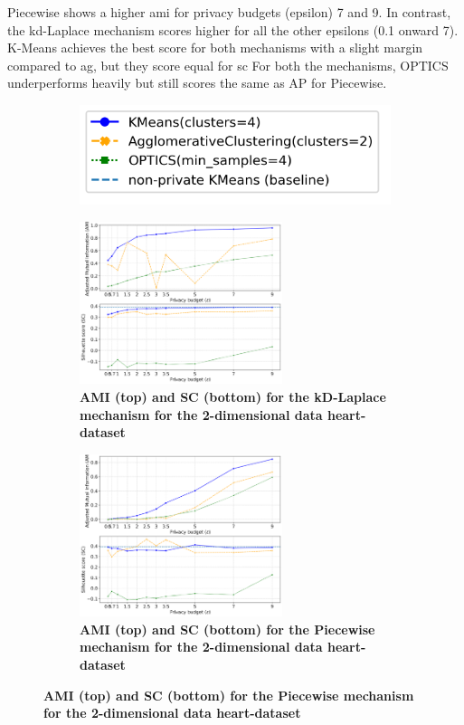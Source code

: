 Piecewise shows a higher \gls{ami} for privacy budgets (epsilon) 7 and 9. In contrast, the kd-Laplace mechanism scores higher for all the other epsilons (0.1 onward 7).
K-Means achieves the best score for both mechanisms with a slight margin compared to \gls{ag}, but they score equal for \gls{sc}
For both the mechanisms, OPTICS underperforms heavily but still scores the same as AP for Piecewise.
\newpage
\begin{figure}[H]
  \centering
  \begin{subfigure}{0.3\textwidth}
    \includegraphics[width=\textwidth]{Results/kd-laplace/kd-Laplace/heart-dataset/legend_2.png}
  \end{subfigure}
  \begin{subfigure}{1\textwidth}
    \caption{\textbf{AMI (top) and SC (bottom) for the kD-Laplace mechanism for the 2-dimensional data heart-dataset}}
    \centering
    \includegraphics[width=0.65\textwidth]{Results/kd-laplace/kd-Laplace/heart-dataset/ami-and-sc_2_dimensions.png}
    \centering
  \end{subfigure}
  \begin{subfigure}{1\textwidth}
    \caption{\textbf{AMI (top) and SC (bottom) for the Piecewise mechanism for the 2-dimensional data heart-dataset}}
    \centering
    \includegraphics[width=0.65\textwidth]{Results/kd-laplace/piecewise/heart-dataset/ami-and-sc_2_dimensions.png}

\end{subfigure}
\end{figure}
